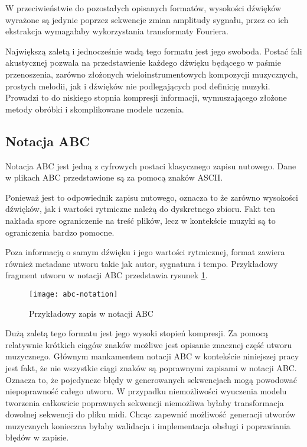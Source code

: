 {{{            W\,\,przeciwieństwie do pozostałych opisanych formatów, wysokości dźwięków wyrażone są 
            jedynie poprzez sekwencje zmian amplitudy sygnału, przez co
            ich ekstrakcja wymagałaby wykorzystania transformaty Fouriera.

            Największą zaletą i\,\,jednocześnie wadą tego formatu jest jego swoboda. 
            Postać fali akustycznej pozwala na przedstawienie każdego dźwięku będącego w\,\,paśmie
            przenoszenia, zarówno złożonych wieloinstrumentowych kompozycji muzycznych, 
            prostych melodii, jak i\,\,dźwięków nie podlegających pod definicję muzyki. 
            Prowadzi to do niskiego stopnia kompresji informacji, wymuszającego złożone metody obróbki i\,\,skomplikowane
            modele uczenia.
        }

        \subsection{Notacja ABC}\label{chap:abc}
        {
            Notacja ABC jest jedną z\,\,cyfrowych postaci klasycznego zapisu nutowego.
            Dane w\,\,plikach ABC przedstawione są za pomocą znaków ASCII.

            Ponieważ jest to odpowiednik zapisu nutowego, oznacza to
            że zarówno wysokości dźwięków, jak i\,\,wartości rytmiczne należą do dyskretnego zbioru.
            Fakt ten nakłada spore ograniczenie na treść plików, lecz w\,\,kontekście muzyki są to 
            ograniczenia bardzo pomocne.

            Poza informacją o\,\,samym dźwięku i\,\,jego wartości rytmicznej, format zawiera również metadane
            utworu takie jak autor, sygnatura i\,\,tempo. Przykładowy fragment utworu w\,\,notacji ABC przedstawia
            rysunek \ref{abcnotation}.

            \begin{figure}
                \centering
                \texttt{[image: abc-notation]}
                \caption{Przykładowy zapis w\,\,notacji ABC}
                \label{abcnotation}
            \end{figure}

            Dużą zaletą tego formatu jest jego wysoki stopień kompresji. Za pomocą relatywnie krótkich ciągów
            znaków możliwe jest opisanie znacznej część utworu muzycznego. Głównym mankamentem notacji ABC
            w\,\,kontekście niniejszej pracy jest fakt, że nie wszystkie ciągi znaków są poprawnymi zapisami 
            w\,\,notacji ABC. Oznacza to, że pojedyncze błędy w\,\,generowanych sekwencjach mogą powodować niepoprawność całego utworu.
            W\,\,przypadku niemożliwości wyuczenia modelu tworzenia całkowicie poprawnych sekwencji niemożliwa byłaby
            transformacja dowolnej sekwencji do pliku midi. Chcąc zapewnić możliwość generacji utworów muzycznych
            konieczna byłaby walidacja i\,\,implementacja obsługi i\,\,poprawiania błędów w\,\,zapisie.
        }

}}
